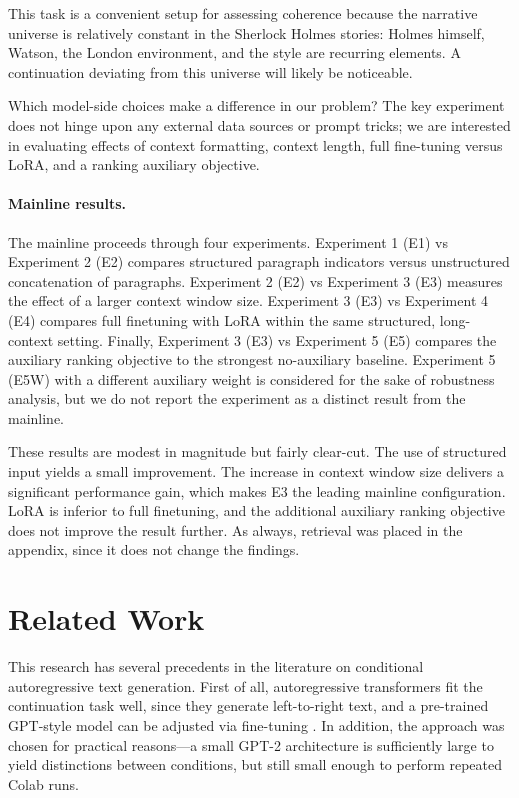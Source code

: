 \documentclass{article}
\newcommand{\expid}[1]{\textsc{#1}}
\begin{document}
This task is a convenient setup for assessing coherence because the narrative universe is relatively constant in the Sherlock Holmes stories: Holmes himself, Watson, the London environment, and the style are recurring elements. A continuation deviating from this universe will likely be noticeable.

Which model-side choices make a difference in our problem? The key experiment does not hinge upon any external data sources or prompt tricks; we are interested in evaluating effects of context formatting, context length, full fine-tuning versus LoRA, and a ranking auxiliary objective.

\paragraph{Mainline results.}
The mainline proceeds through four experiments. Experiment 1 (\expid{E1}) vs Experiment 2 (\expid{E2}) compares structured paragraph indicators versus unstructured concatenation of paragraphs. Experiment 2 (\expid{E2}) vs Experiment 3 (\expid{E3}) measures the effect of a larger context window size. Experiment 3 (\expid{E3}) vs Experiment 4 (\expid{E4}) compares full finetuning with LoRA within the same structured, long-context setting. Finally, Experiment 3 (\expid{E3}) vs Experiment 5 (\expid{E5}) compares the auxiliary ranking objective to the strongest no-auxiliary baseline. Experiment 5 (\expid{E5W}) with a different auxiliary weight is considered for the sake of robustness analysis, but we do not report the experiment as a distinct result from the mainline.

These results are modest in magnitude but fairly clear-cut. The use of structured input yields a small improvement. The increase in context window size delivers a significant performance gain, which makes \expid{E3} the leading mainline configuration. LoRA is inferior to full finetuning, and the additional auxiliary ranking objective does not improve the result further. As always, retrieval was placed in the appendix, since it does not change the findings.

\section{Related Work}

This research has several precedents in the literature on conditional autoregressive text generation. First of all, autoregressive transformers fit the continuation task well, since they generate left-to-right text, and a pre-trained GPT-style model can be adjusted via fine-tuning \citep{vaswani2017attention,radford2019language}. In addition, the approach was chosen for practical reasons---a small GPT-2 architecture is sufficiently large to yield distinctions between conditions, but still small enough to perform repeated Colab runs.
\end{document}
